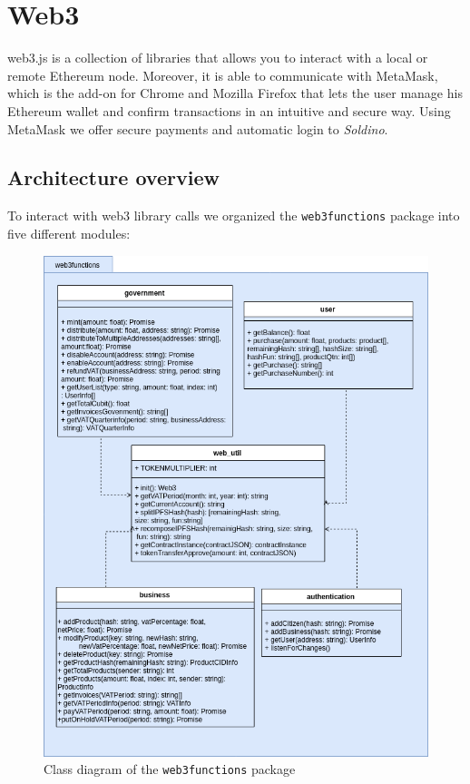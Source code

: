 \section{Web3} 
web3.js is a collection of libraries that allows you to interact with a local or remote Ethereum node. Moreover, it is able to communicate with MetaMask, which is the add-on for Chrome and Mozilla Firefox that lets the user manage his Ethereum wallet and confirm transactions in an intuitive and secure way. Using MetaMask we offer secure payments and automatic login to \textit{Soldino}.
\subsection{Architecture overview}
To interact with web3 library calls we organized the \texttt{web3functions} package into five different modules:
\begin{figure}[h]
	\centering
	\includegraphics[scale=0.47]{res/images/web3.png}
	\caption{Class diagram of the \texttt{web3functions} package}
\end{figure}
